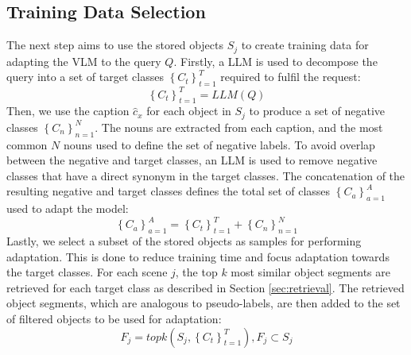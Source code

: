 \subsection{Training Data Selection}
\label{sec:training_data}
The next step aims to use the stored objects $S_{j}$ to create training data for adapting the VLM to the query $Q$. Firstly, a LLM is used to decompose the query into a set of target classes $\left\{C_{t} \right\}_{t=1}^{T}$ required to fulfil the request:
\begin{equation}
    \left\{C_{t} \right\}_{t=1}^{T} = LLM\left( Q\right)
\end{equation}
Then, we use the caption $\hat{c}_{x}$ for each object in $S_{j}$ to produce a set of negative classes $\left\{C_{n} \right\}_{n=1}^{N}$.
The nouns are extracted from each caption, and the most common $N$ nouns used to define the set of negative labels. 
To avoid overlap between the negative and target classes, an LLM is used to remove negative classes that have a direct synonym in the target classes. 
The concatenation of the resulting negative and target classes defines the total set of classes $\left\{C_{a} \right\}_{a=1}^{A}$ used to adapt the model:
\begin{equation}
    \left\{C_{a} \right\}_{a=1}^{A} = \left\{C_{t} \right\}_{t=1}^{T} + \left\{C_{n} \right\}_{n=1}^{N}
\end{equation}
Lastly, we select a subset of the stored objects as samples for performing adaptation. This is done to reduce training time and focus adaptation towards the target classes.
For each scene $j$, the top $k$ most similar object segments are retrieved for each target class as described in Section \ref{sec:retrieval}.
The retrieved object segments, which are analogous to pseudo-labels, are then added to the set of filtered objects to be used for adaptation:
\begin{equation}
    F_{j} = topk\left(S_{j}, \left\{C_{t} \right\}_{t=1}^{T} \right), F_{j} \subset S_{j}
\end{equation}


